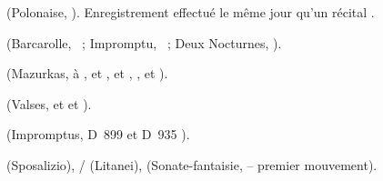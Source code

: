 \begin{description}
 \item[]
 \Chopin{} (Polonaise,  ).
 Enregistrement effectué le même jour qu'un récital \Scriabine{}.
 \item[]
 \Chopin{} (Barcarolle, ~; Impromptu, ~; Deux Nocturnes,
 ).
 \item[]
 \Chopin{} (Mazurkas,   à , 
  et ,   et , 
 ,   et  ).
 \item[]
 \Chopin{} (Valses,   et   et
 ).
 \item[]
 \Schubert{} (Impromptus, D~899  et D~935 ).
 \item[]
 \Liszt{} (Sposalizio), \Schubert{}/\Liszt{} (Litanei), \Scriabine{}
 (Sonate-fantaisie,  -- premier mouvement).
\end{description}
